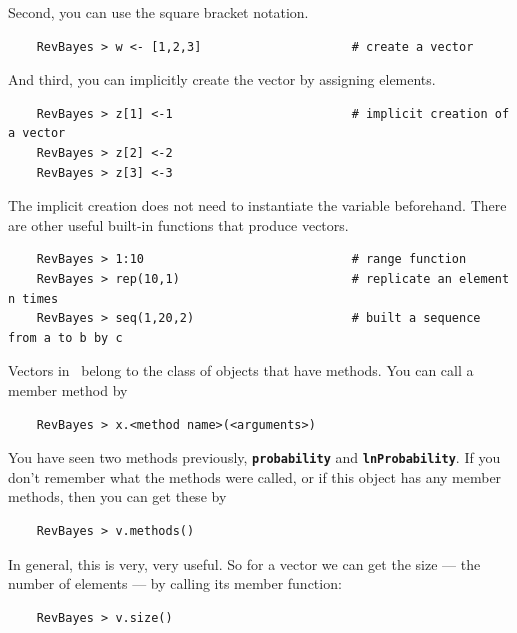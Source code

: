 \documentclass[11pt]{article}
\newcommand{\cl}[1]{{\texttt{\textbf{#1}}}}
\begin{document}
Second, you can use the square bracket notation.
{\tt \begin{snugshade*}
\begin{lstlisting}    
    RevBayes > w <- [1,2,3]                     # create a vector
\end{lstlisting}
\end{snugshade*}}
And third, you can implicitly create the vector by assigning elements.
{\tt \begin{snugshade*}
\begin{lstlisting}    
    RevBayes > z[1] <-1                         # implicit creation of a vector
    RevBayes > z[2] <-2                   
    RevBayes > z[3] <-3                  
\end{lstlisting}
\end{snugshade*}} 
The implicit creation does not need to instantiate the variable beforehand.
There are other useful built-in functions that produce vectors.
{\tt \begin{snugshade*}
\begin{lstlisting}    
    RevBayes > 1:10                             # range function
    RevBayes > rep(10,1)                        # replicate an element n times
    RevBayes > seq(1,20,2)                      # built a sequence from a to b by c
\end{lstlisting}
\end{snugshade*}} 

Vectors in \Rev~belong to the class of objects that have methods.
You  can call a member method by
{\tt \begin{snugshade*}
\begin{lstlisting}    
    RevBayes > x.<method name>(<arguments>)                 
\end{lstlisting}
\end{snugshade*}} 
You have seen two methods previously, \cl{probability} and \cl{lnProbability}.
If you don't remember what the methods were called, or if this object has any member methods, then you can get these by
{\tt \begin{snugshade*}
\begin{lstlisting}    
    RevBayes > v.methods()                 
\end{lstlisting}
\end{snugshade*}} 
In general, this is very, very useful.
So for a vector we can get the size --- the number of elements --- by calling its member function:
{\tt \begin{snugshade*}
\begin{lstlisting}    
    RevBayes > v.size()                 
\end{lstlisting}
\end{snugshade*}} 
\end{document}
